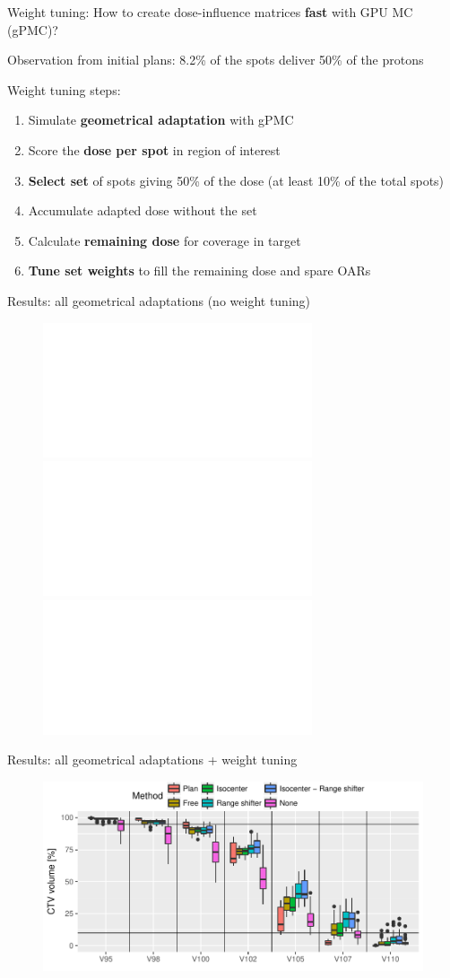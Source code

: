 \documentclass[pdf,dvipsnames,aspectratio=169]{beamer}
\begin{document}
\begin{frame}[c]{Weight tuning:}
    How to create dose-influence matrices \textbf{fast} with GPU MC (gPMC)?
    \newline
    
    \pause
    
    Observation from initial plans: 8.2\% of the spots deliver 50\% of the protons
    \newline
    
    \pause
	
	Weight tuning steps:
    \begin{enumerate}
    	\item Simulate \textbf{geometrical adaptation} with gPMC
    	\item Score the \textbf{dose per spot} in region of interest
    	\pause
    	\item \textbf{Select set} of spots giving 50\% of the dose (at least 10\% of the total spots)
    	\item Accumulate adapted dose without the set
    	\item Calculate \textbf{remaining dose} for coverage in target
    	\pause
    	\item \textbf{Tune set weights} to fill the remaining dose and spare OARs
    \end{enumerate}
\end{frame}


\begin{frame}[c]{Results: all geometrical adaptations (no weight tuning)}
  \pause
    \begin{figure}[b!]
        \centering
        \includegraphics<2|handout:O>[width=\textwidth]{imgs/DVH_points_geometric_nonadapt.pdf}
        \includegraphics<3|handout:O>[width=\textwidth]{imgs/DVH_points_geometric_adapt.pdf}
        \includegraphics<4>[width=\textwidth]{imgs/DVH_points_geometric.pdf}
    \end{figure}
\end{frame}

\begin{frame}[c]{Results: all geometrical adaptations + weight tuning}
    \begin{figure}[b!]
        \centering
        \includegraphics[width=\textwidth]{imgs/DVH_points_weights.pdf}
    \end{figure}
\end{frame}
\end{document}
